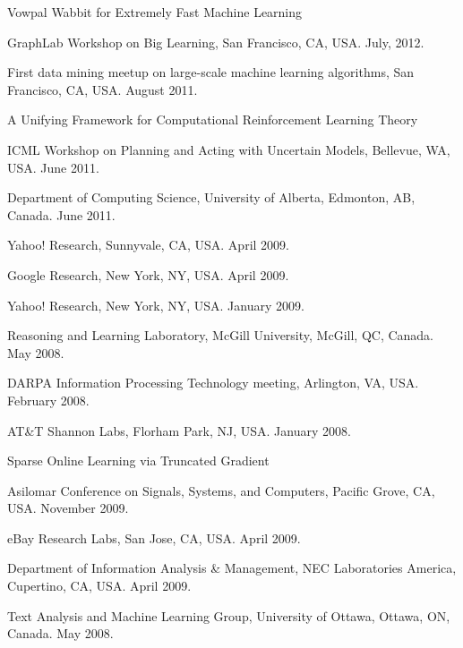 \documentclass[10pt,twoside,letterpaper]{article}
\newcommand{\negitemspace}{\vspace{1mm}}
\begin{document}
\begin{compactitem}
\item{Vowpal Wabbit for Extremely Fast Machine Learning}
\begin{compactitem}
\item{GraphLab Workshop on Big Learning, San Francisco, CA, USA.  July, 2012.}
\item{First data mining meetup on large-scale machine learning algorithms, San Francisco, CA, USA.  August 2011.}
\end{compactitem} \negitemspace

\item{A Unifying Framework for Computational Reinforcement Learning Theory}
\begin{compactitem}
\item{ICML Workshop on Planning and Acting with Uncertain Models, Bellevue, WA, USA.  June 2011.}
\item{Department of Computing Science, University of Alberta, Edmonton, AB, Canada. June 2011.}
\item{Yahoo! Research, Sunnyvale, CA, USA.  April 2009.}
\item{Google Research, New York, NY, USA.  April 2009.}
\item{Yahoo! Research, New York, NY, USA.  January 2009.}
\item{Reasoning and Learning Laboratory, McGill University,
McGill, QC, Canada.  May 2008.}
\item{DARPA Information Processing Technology meeting, Arlington, VA, USA.  February 2008.}
\item{AT\&T Shannon Labs, Florham Park, NJ, USA.  January 2008.}
\end{compactitem} \negitemspace

\item{Sparse Online Learning via Truncated Gradient}
\begin{compactitem}
\item{Asilomar Conference on Signals, Systems, and Computers,
Pacific Grove, CA, USA.  November 2009.}
\item{eBay Research Labs, San Jose, CA, USA.  April 2009.}
\item{Department of Information Analysis \& Management, NEC
Laboratories America, Cupertino, CA, USA.  April 2009.}
\item{Text Analysis and Machine Learning Group, University of
Ottawa, Ottawa, ON, Canada.  May 2008.}
\end{compactitem} \negitemspace

\end{compactitem}
\end{document}
